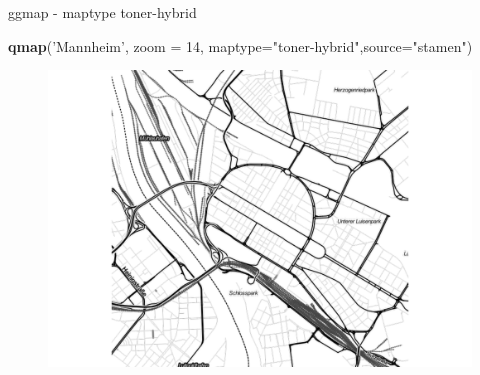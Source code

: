\documentclass[ignorenonframetext,]{beamer}
\newenvironment{Shaded}{}{}
\newcommand{\KeywordTok}[1]{\textcolor[rgb]{0.00,0.44,0.13}{\textbf{{#1}}}}
\newcommand{\DataTypeTok}[1]{\textcolor[rgb]{0.56,0.13,0.00}{{#1}}}
\newcommand{\DecValTok}[1]{\textcolor[rgb]{0.25,0.63,0.44}{{#1}}}
\newcommand{\StringTok}[1]{\textcolor[rgb]{0.25,0.44,0.63}{{#1}}}
\newcommand{\NormalTok}[1]{{#1}}
\begin{document}
\begin{frame}[fragile]{ggmap - maptype toner-hybrid}

\begin{Shaded}
\begin{Highlighting}[]
\KeywordTok{qmap}\NormalTok{(}\StringTok{'Mannheim'}\NormalTok{, }\DataTypeTok{zoom =} \DecValTok{14}\NormalTok{,}
 \DataTypeTok{maptype=}\StringTok{"toner-hybrid"}\NormalTok{,}\DataTypeTok{source=}\StringTok{"stamen"}\NormalTok{)}
\end{Highlighting}
\end{Shaded}

\begin{figure}[htbp]
\centering
\includegraphics{RSocialScience2_files/figure-beamer/unnamed-chunk-44-1.pdf}
\caption{}
\end{figure}

\end{frame}
\end{document}
